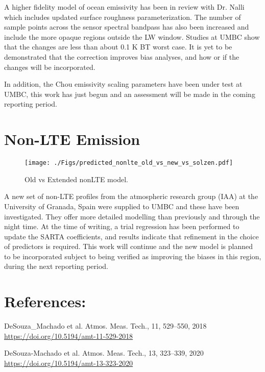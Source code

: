 \documentclass[11pt,twocolumn]{article}
\begin{document}
A higher fidelity model of ocean emissivity has been in review with Dr. Nalli
which includes updated surface roughness parameterization. The number of sample points
across the sensor spectral bandpass has also been increased and include the more
opaque regions outside the LW window. Studies at UMBC show that the changes are less
than about 0.1 K BT worst case. It is yet to be demonstrated that the correction improves
bias analyses, and how or if the changes will be incorporated.

In addition, the Chou emissivity scaling parameters have been under test at UMBC,
this work has just begun and an assessment will be made in the coming reporting period.


\section{Non-LTE Emission}
\label{sec:org8ad5b16}

\begin{figure}[htbp]
\centering
\texttt{[image: ./Figs/predicted\_nonlte\_old\_vs\_new\_vs\_solzen.pdf]}
\caption{\label{fig:orgd62a7e3}Old vs Extended nonLTE model.}
\end{figure}

A new set of non-LTE profiles from the atmospheric
research group (IAA) at the University of Granada, Spain were supplied
to UMBC and these have been investigated. They offer more detailed
modelling than previously and through the night time.
At the time of writing, a trial
regression has been performed to update the SARTA coefficients, and results
indicate that refinement in the choice of predictors is required. This work
will continue and the new model is planned to be incorporated subject
to being verified as improving the biases in this region, during
the next reporting period.


\section{References:}
\label{sec:orga0f8507}
DeSouza\_Machado et al. Atmos. Meas. Tech., 11, 529–550, 2018
\url{https://doi.org/10.5194/amt-11-529-2018}

DeSouza-Machado et al. Atmos. Meas. Tech., 13, 323–339, 2020
\url{https://doi.org/10.5194/amt-13-323-2020}
\end{document}
